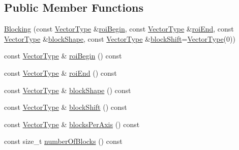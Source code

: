 \subsection*{Public Member Functions}
\begin{DoxyCompactItemize}
\item 
\hyperlink{classnifty_1_1tools_1_1Blocking_a72c8db4f834fd774f6a50e03ef4b30c2}{Blocking} (const \hyperlink{classnifty_1_1tools_1_1Blocking_a5f8df3d4cdf09803217d729a04018fb3}{Vector\+Type} \&\hyperlink{classnifty_1_1tools_1_1Blocking_a2ce7ed87ad053c943954873e70621ab8}{roi\+Begin}, const \hyperlink{classnifty_1_1tools_1_1Blocking_a5f8df3d4cdf09803217d729a04018fb3}{Vector\+Type} \&\hyperlink{classnifty_1_1tools_1_1Blocking_a19b6329454038905f9c66ebed3094205}{roi\+End}, const \hyperlink{classnifty_1_1tools_1_1Blocking_a5f8df3d4cdf09803217d729a04018fb3}{Vector\+Type} \&\hyperlink{classnifty_1_1tools_1_1Blocking_aa42bfae6940045db062898f66345897b}{block\+Shape}, const \hyperlink{classnifty_1_1tools_1_1Blocking_a5f8df3d4cdf09803217d729a04018fb3}{Vector\+Type} \&\hyperlink{classnifty_1_1tools_1_1Blocking_a7efe756ab0f686e2edb39fb800cea37f}{block\+Shift}=\hyperlink{classnifty_1_1tools_1_1Blocking_a5f8df3d4cdf09803217d729a04018fb3}{Vector\+Type}(0))
\item 
const \hyperlink{classnifty_1_1tools_1_1Blocking_a5f8df3d4cdf09803217d729a04018fb3}{Vector\+Type} \& \hyperlink{classnifty_1_1tools_1_1Blocking_a2ce7ed87ad053c943954873e70621ab8}{roi\+Begin} () const
\item 
const \hyperlink{classnifty_1_1tools_1_1Blocking_a5f8df3d4cdf09803217d729a04018fb3}{Vector\+Type} \& \hyperlink{classnifty_1_1tools_1_1Blocking_a19b6329454038905f9c66ebed3094205}{roi\+End} () const
\item 
const \hyperlink{classnifty_1_1tools_1_1Blocking_a5f8df3d4cdf09803217d729a04018fb3}{Vector\+Type} \& \hyperlink{classnifty_1_1tools_1_1Blocking_aa42bfae6940045db062898f66345897b}{block\+Shape} () const
\item 
const \hyperlink{classnifty_1_1tools_1_1Blocking_a5f8df3d4cdf09803217d729a04018fb3}{Vector\+Type} \& \hyperlink{classnifty_1_1tools_1_1Blocking_a7efe756ab0f686e2edb39fb800cea37f}{block\+Shift} () const
\item 
const \hyperlink{classnifty_1_1tools_1_1Blocking_a5f8df3d4cdf09803217d729a04018fb3}{Vector\+Type} \& \hyperlink{classnifty_1_1tools_1_1Blocking_ad736ea915574470bc35e35df5a11a9f3}{blocks\+Per\+Axis} () const
\item 
const size\+\_\+t \hyperlink{classnifty_1_1tools_1_1Blocking_af8848458068c1d943b42980809a93744}{number\+Of\+Blocks} () const

\end{DoxyCompactItemize}
